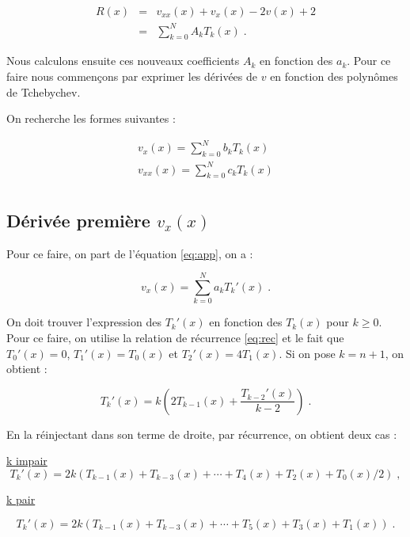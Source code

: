 \documentclass{report}
\begin{document}
\begin{eqnarray}
R(x) & = & v_{xx}(x) + v_x(x) - 2v(x) + 2 \\
& = & \sum_{k=0}^N A_{k} T_{k}(x)\;. \label{eq:reste}
\end{eqnarray}

Nous calculons ensuite ces nouveaux coefficients $A_{k}$ en fonction des $a_{k}$. Pour ce faire nous commençons par exprimer les dérivées de $v$ en fonction des polynômes de Tchebychev.

On recherche les formes suivantes : 

\begin{eqnarray}
v_{x}(x) = \sum_{k=0}^N b_k T_k(x) \label{eq:vxb}\\
v_{xx}(x) = \sum_{k=0}^N c_k T_k(x) \\
\end{eqnarray}

\subsection*{Dérivée première $v_{x}(x)$}

Pour ce faire, on part de l'équation \eqref{eq:app}, on a :

\begin{equation}
v_{x}(x) = \sum_{k=0}^N a_k T_{k}'(x)\;.\label{eq:vxa}
\end{equation}

On doit trouver l'expression des $T_{k}'(x)$ en fonction des $T_{k}(x)$ pour $k \geq 0$. Pour ce faire, on utilise la relation de récurrence \eqref{eq:rec} et le fait que $T_0' (x) = 0$, $T_1' (x) = T_0 (x)$ et $T_2' (x) = 4T_1 (x)$. Si on pose $k=n+1$, on obtient :

\begin{equation}
T_{k}'(x)  = k\left(2T_{k-1}(x)+\frac{T_{k-2}'(x)}{k-2}\right)\;.
\end{equation}

En la réinjectant dans son terme de droite, par récurrence, on obtient deux cas :

\underline{k impair}
\begin{equation}
T_{k}'(x)  = 2k\left(T_{k-1}(x)+T_{k-3}(x)+\cdots+T_{4}(x)+T_{2}(x)+T_{0}(x)/2\right)\;,\label{eq:kimpair}
\end{equation}

\underline{k pair} 

\begin{equation}
T_{k}'(x)  = 2k\left(T_{k-1}(x)+T_{k-3}(x)+\cdots+T_{5}(x)+T_{3}(x)+T_{1}(x)\right)\;.\label{eq:kpair}
\end{equation}
\end{document}
